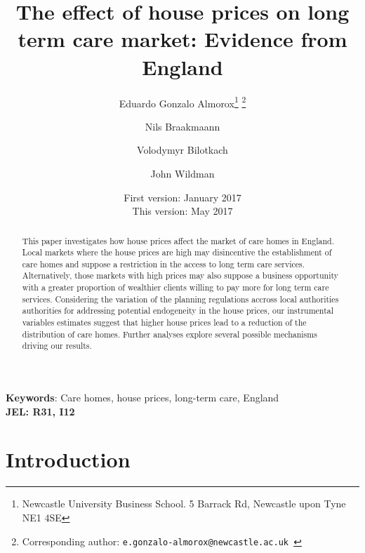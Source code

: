 \documentclass[12pt,letterpaper]{article}
\begin{document}
\title{\LARGE{The effect of house prices on long term care market: Evidence from England}}
\author{Eduardo Gonzalo Almorox\thanks{Newcastle University Business School. 5 Barrack Rd, Newcastle upon Tyne NE1 4SE} \thanks{Corresponding author: \tt{e.gonzalo-almorox@newcastle.ac.uk} } \and Nils Braakmaann\footnotemark[1]
 \and Volodymyr Bilotkach\footnotemark[1] \and John Wildman\footnotemark[1]}


\date{First version: January 2017\\ This version: May 2017}
\maketitle

\begin{abstract}
This paper investigates how house prices affect the market of care homes in 
England. Local markets where the house prices are high may disincentive the establishment of care homes 
and suppose a restriction in the access to long term care services. Alternatively, 
 those markets with high prices may also suppose a business opportunity with a greater proportion of wealthier clients willing to 
 pay more for long term care services. Considering the variation of the planning regulations accross 
 local authorities authorities for addressing
 potential endogeneity in the house prices, our instrumental variables estimates suggest that higher house prices lead to a reduction of 
 the distribution of care homes. Further analyses explore several possible mechanisms driving 
 our results. 

\end{abstract}

{{\bf{Keywords}}: Care homes, house prices, long-term care, England\\
\bf{JEL}: R31, I12}



\newpage
\section{Introduction}
\label{sec: intro}
\end{document}
